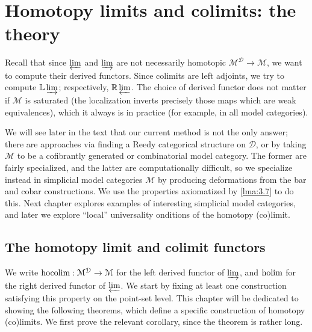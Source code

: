 \chapter{Homotopy limits and colimits: the theory}

Recall that since $\varprojlim $ and $\varinjlim $ are not necessarily homotopic $\mathcal{M} ^{\mathcal{D} } \to \mathcal{M} $, we want to compute their derived functors. Since colimits are left adjoints, we try to compute $\mathbb{L} \varinjlim $; respectively, $\mathbb{R} \varprojlim $. The choice of derived functor does not matter if $\mathcal{M} $ is saturated (the localization inverts precisely those maps which are weak equivalences), which it always is in practice (for example, in all model categories).

We will see later in the text that our current method is not the only answer; there are approaches via finding a Reedy categorical structure on $\mathcal{D} $, or by taking $\mathcal{M} $ to be a cofibrantly generated or combinatorial model category. The former are fairly specialized, and the latter are computationally difficult, so we specialize instead in simplicial model categories $\mathcal{M} $ by producing deformations from the bar and cobar constructions. We use the properties axiomatized by \cref{lma:3.7} to do this. Next chapter explores examples of interesting simplicial model categories, and later we explore ``local'' universality onditions of the homotopy (co)limit.

\section{The homotopy limit and colimit functors}

We write $\operatorname*{hocolim} : \mathcal{M} ^{\mathcal{D} }  \to \mathcal{M} $ for the left derived functor of $\varinjlim $, and $\operatorname*{holim} $ for the right derived functor of $\varprojlim $. We start by fixing at least one construction satisfying this property on the point-set level. This chapter will be dedicated to showing the following theorems, which define a specific construction of homotopy (co)limits. We first prove the relevant corollary, since the theorem is rather long.

